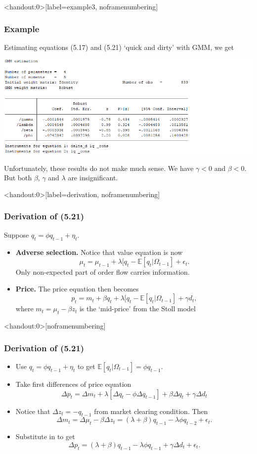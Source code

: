 \documentclass[english,10pt]{beamer}
\begin{document}
\begin{frame}<handout:0>[label=example3, noframenumbering]
\frametitle{Example}
Estimating equations (5.17) and (5.21) `quick and dirty' with GMM, we get
\begin{center}
\includegraphics[scale=0.42]{pics/eqgmm}
\end{center}
Unfortunately, these results do not make much sense. We have $\gamma<0$ and $\beta<0$. But both $\beta$, $\gamma$ and $\lambda$ are insignificant.
 \hyperlink{extending}{}
\end{frame}


\begin{frame}<handout:0>[label=derivation, noframenumbering]
\frametitle{Derivation of (5.21)}
Suppose $q_t=\phi q_{t-1}+\eta_{t}$. 
\begin{itemize}
\item \textbf{Adverse selection.} Notice that value equation is now
\[
\mu_t=\mu_{t-1}+\lambda[q_t-\mathbb{E}[q_t|\Omega_{t-1}]+\epsilon_t.
\]
Only non-expected part of order flow carries information. 
\item \textbf{Price.} The price equation then becomes
\[
p_t=m_t+\beta q_t+\lambda[q_t-\mathbb{E}[q_t|\Omega_{t-1}]+\gamma d_t,
\]
where $m_t=\mu_t-\beta z_t$ is the `mid-price' from the Stoll model 
\end{itemize}
\end{frame}


\begin{frame}<handout:0>[noframenumbering]
\frametitle{Derivation of (5.21)}
\begin{itemize}
\item Use $q_t=\phi q_{t-1}+\eta_{t}$ to get $\mathbb{E}[q_t|\Omega_{t-1}]=\phi q_{t-1}$.
\item Take first differences of price equation
\[
\Delta p_t = \Delta m_t + \lambda [ \Delta q_t-\phi\Delta q_{t-1}]+\beta \Delta q_t+\gamma \Delta d_t
\]
\item Notice that $\Delta z_t=-q_{t-1}$ from market clearing condition. Then
\[
\Delta m_t = \Delta \mu_t-\beta \Delta z_t = (\lambda+\beta)q_{t-1}-\lambda \phi q_{t-2}+\epsilon_t.
\]
\item Substitute in to get
\[
\Delta p_t =(\lambda+\beta)q_{t-1} - \lambda\phi  q_{t-1}+\gamma \Delta d_t+\epsilon_t.
\]
\hyperlink{extending}{}
\end{itemize}
\end{frame}
\end{document}
